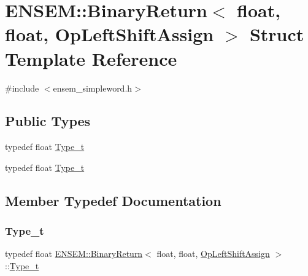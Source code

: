 \hypertarget{structENSEM_1_1BinaryReturn_3_01float_00_01float_00_01OpLeftShiftAssign_01_4}{}\section{E\+N\+S\+EM\+:\+:Binary\+Return$<$ float, float, Op\+Left\+Shift\+Assign $>$ Struct Template Reference}
\label{structENSEM_1_1BinaryReturn_3_01float_00_01float_00_01OpLeftShiftAssign_01_4}


{\ttfamily \#include $<$ensem\+\_\+simpleword.\+h$>$}

\subsection*{Public Types}
\begin{DoxyCompactItemize}
\item 
typedef float \mbox{\hyperlink{structENSEM_1_1BinaryReturn_3_01float_00_01float_00_01OpLeftShiftAssign_01_4_a5a606c4c7a70df274b8a186efebfd11e}{Type\+\_\+t}}
\item 
typedef float \mbox{\hyperlink{structENSEM_1_1BinaryReturn_3_01float_00_01float_00_01OpLeftShiftAssign_01_4_a5a606c4c7a70df274b8a186efebfd11e}{Type\+\_\+t}}
\end{DoxyCompactItemize}


\subsection{Member Typedef Documentation}
\mbox{\label{structENSEM_1_1BinaryReturn_3_01float_00_01float_00_01OpLeftShiftAssign_01_4_a5a606c4c7a70df274b8a186efebfd11e}} 
\subsubsection{\texorpdfstring{Type\_t}{Type\_t}\hspace{0.1cm}{\footnotesize\ttfamily [1/2]}}
{\footnotesize\ttfamily typedef float \mbox{\hyperlink{structENSEM_1_1BinaryReturn}{E\+N\+S\+E\+M\+::\+Binary\+Return}}$<$ float, float, \mbox{\hyperlink{structENSEM_1_1OpLeftShiftAssign}{Op\+Left\+Shift\+Assign}} $>$\+::\mbox{\hyperlink{structENSEM_1_1BinaryReturn_3_01float_00_01float_00_01OpLeftShiftAssign_01_4_a5a606c4c7a70df274b8a186efebfd11e}{Type\+\_\+t}}}

